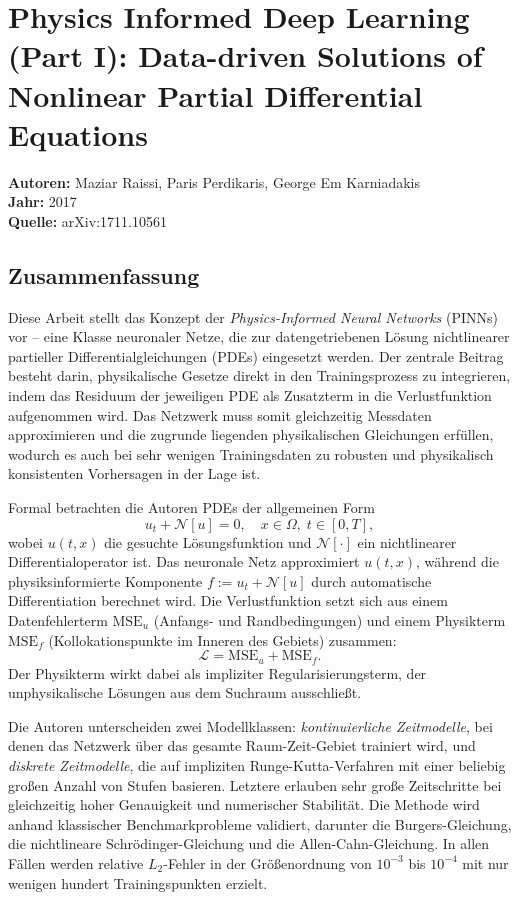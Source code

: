 \documentclass[a4paper,12pt]{article}
\begin{document}
\section*{Physics Informed Deep Learning (Part I): Data-driven Solutions of Nonlinear Partial Differential Equations}
\textbf{Autoren:} Maziar Raissi, Paris Perdikaris, George Em Karniadakis \\
\textbf{Jahr:} 2017 \\
\textbf{Quelle:} arXiv:1711.10561

\subsection*{Zusammenfassung}

Diese Arbeit stellt das Konzept der \textit{Physics-Informed Neural Networks} (PINNs) vor -- eine Klasse neuronaler Netze, die zur datengetriebenen Lösung nichtlinearer partieller Differentialgleichungen (PDEs) eingesetzt werden. Der zentrale Beitrag besteht darin, physikalische Gesetze direkt in den Trainingsprozess zu integrieren, indem das Residuum der jeweiligen PDE als Zusatzterm in die Verlustfunktion aufgenommen wird. Das Netzwerk muss somit gleichzeitig Messdaten approximieren und die zugrunde liegenden physikalischen Gleichungen erfüllen, wodurch es auch bei sehr wenigen Trainingsdaten zu robusten und physikalisch konsistenten Vorhersagen in der Lage ist.

Formal betrachten die Autoren PDEs der allgemeinen Form
\begin{equation*}
    u_t + \mathcal{N}[u] = 0, \quad x \in \Omega,\; t \in [0, T],
\end{equation*}
wobei $u(t,x)$ die gesuchte Lösungsfunktion und $\mathcal{N}[\cdot]$ ein nichtlinearer Differentialoperator ist. Das neuronale Netz approximiert $u(t,x)$, während die physiksinformierte Komponente $f := u_t + \mathcal{N}[u]$ durch automatische Differentiation berechnet wird. Die Verlustfunktion setzt sich aus einem Datenfehlerterm $\text{MSE}_u$ (Anfangs- und Randbedingungen) und einem Physikterm $\text{MSE}_f$ (Kollokationspunkte im Inneren des Gebiets) zusammen:
\begin{equation*}
    \mathcal{L} = \text{MSE}_u + \text{MSE}_f.
\end{equation*}
Der Physikterm wirkt dabei als impliziter Regularisierungsterm, der unphysikalische Lösungen aus dem Suchraum ausschließt.

Die Autoren unterscheiden zwei Modellklassen: \textit{kontinuierliche Zeitmodelle}, bei denen das Netzwerk über das gesamte Raum-Zeit-Gebiet trainiert wird, und \textit{diskrete Zeitmodelle}, die auf impliziten Runge-Kutta-Verfahren mit einer beliebig großen Anzahl von Stufen basieren. Letztere erlauben sehr große Zeitschritte bei gleichzeitig hoher Genauigkeit und numerischer Stabilität. Die Methode wird anhand klassischer Benchmarkprobleme validiert, darunter die Burgers-Gleichung, die nichtlineare Schrödinger-Gleichung und die Allen-Cahn-Gleichung. In allen Fällen werden relative $L_2$-Fehler in der Größenordnung von $10^{-3}$ bis $10^{-4}$ mit nur wenigen hundert Trainingspunkten erzielt.
\end{document}
